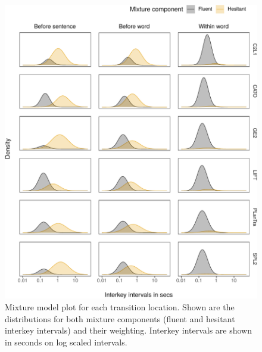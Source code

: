 \documentclass[
  man,floatsintext]{apa7}
\begin{document}
\begin{figure}

{\centering \includegraphics{manuscript_files/figure-latex/mixmodel-1} 

}

\caption{Mixture model plot for each transition location. Shown are the distributions for both mixture components (fluent and hesitant interkey intervals) and their weighting. Interkey intervals are shown in seconds on log scaled intervals.}\label{fig:mixmodel}
\end{figure}
\end{document}
